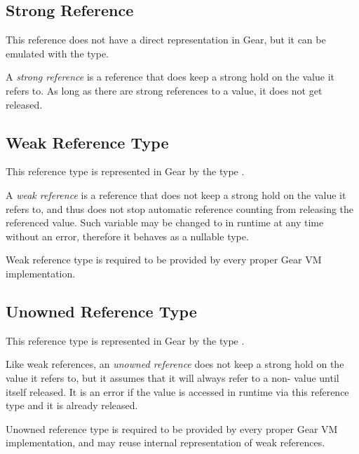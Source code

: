 \subsection{Strong Reference}

This reference does not have a direct representation in Gear, but it can be emulated with the  type. 

A {\em strong reference} is a reference that does keep a strong hold on the value it refers to. As long as there are strong references to a value, it does not get released. 






\subsection{Weak Reference Type}

This reference type is represented in Gear by the type . 

A {\em weak reference} is a reference that does not keep a strong hold on the value it refers to, and thus does not stop automatic reference counting from releasing the referenced value. Such variable may be changed to  in runtime at any time without an error, therefore it behaves as a nullable type. 

Weak reference type is required to be provided by every proper Gear VM implementation. 





\subsection{Unowned Reference Type}

This reference type is represented in Gear by the type . 

Like weak references, an {\em unowned reference} does not keep a strong hold on the value it refers to, but it assumes that it will always refer to a non- value until itself released. It is an error if the value is accessed in runtime via this reference type and it is already released. 

Unowned reference type is required to be provided by every proper Gear VM implementation, and may reuse internal representation of weak references. 





